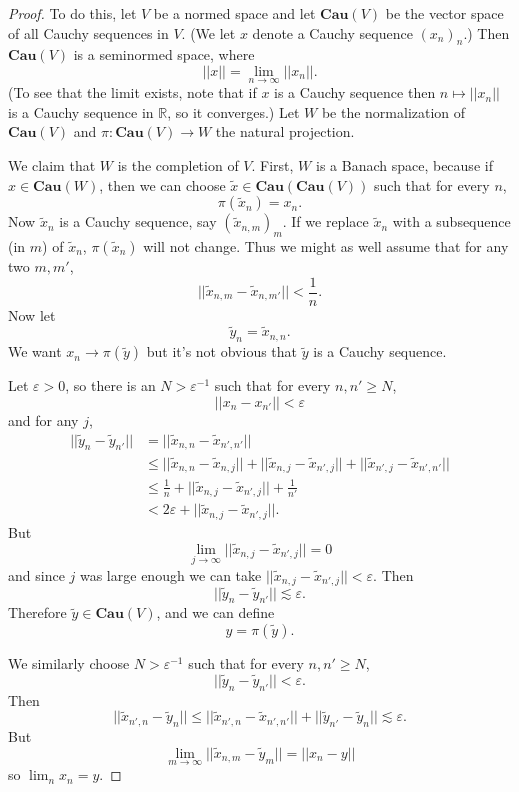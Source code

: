 \documentclass[12pt]{book}
\newcommand{\RR}{\mathbb{R}}
\newcommand{\Cau}{\mathbf{Cau}}
\theoremstyle{definition}
\begin{document}
\begin{proof}
To do this, let $V$ be a normed space and let $\Cau (V)$ be the vector space of all Cauchy sequences in $V$.
(We let $x$ denote a Cauchy sequence $(x_n)_n$.)
Then $\Cau (V)$ is a seminormed space, where
$$||x|| = \lim_{n \to \infty} ||x_n||.$$
(To see that the limit exists, note that if $x$ is a Cauchy sequence then $n \mapsto ||x_n||$ is a Cauchy sequence in $\RR$, so it converges.)
Let $W$ be the normalization of $\Cau (V)$ and $\pi: \Cau (V) \to W$ the natural projection.

We claim that $W$ is the completion of $V$.
First, $W$ is a Banach space, because if $x \in \Cau (W)$, then we can choose $\widetilde x \in \Cau (\Cau (V))$ such that for every $n$,
$$\pi(\widetilde x_n) = x_n.$$
Now $\widetilde x_n$ is a Cauchy sequence, say $(\widetilde x_{n,m})_m$. If we replace $\widetilde x_n$ with a subsequence (in $m$) of $\widetilde x_n$, $\pi(\widetilde x_n)$ will not change.
Thus we might as well assume that for any two $m,m'$,
$$||\widetilde x_{n,m} - \widetilde x_{n,m'}|| < \frac{1}{n}.$$
Now let
$$\widetilde y_n = \widetilde x_{n,n}.$$
We want $x_n \to \pi(\widetilde y)$ but it's not obvious that $\widetilde y$ is a Cauchy sequence.

Let $\varepsilon > 0$, so there is an $N > \varepsilon^{-1}$ such that for every $n, n' \geq N$,
$$||x_n - x_{n'}|| < \varepsilon$$
and for any $j$,
\begin{align*}
  ||\widetilde y_n - \widetilde y_{n'}|| &= ||\widetilde x_{n,n} - \widetilde x_{n',n'}||\\
  &\leq ||\widetilde x_{n,n} - \widetilde x_{n,j}|| + ||\widetilde x_{n,j} - \widetilde x_{n',j}|| + ||\widetilde x_{n',j} - \widetilde x_{n',n'}||\\
  &\leq \frac{1}{n} + ||\widetilde x_{n,j} - \widetilde x_{n',j}|| + \frac{1}{n'}\\
  &< 2\varepsilon + ||\widetilde x_{n,j} - \widetilde x_{n',j}||.
\end{align*}
But
$$\lim_{j \to \infty} ||\widetilde x_{n,j} - \widetilde x_{n',j}|| = 0$$
and since $j$ was large enough we can take $||\widetilde x_{n,j} - \widetilde x_{n',j}|| < \varepsilon$. Then
$$||\widetilde y_n - \widetilde y_{n'}|| \lesssim \varepsilon.$$
Therefore $\widetilde y \in \Cau (V)$, and we can define
$$y = \pi(\widetilde y).$$

We similarly choose $N > \varepsilon^{-1}$ such that for every $n, n' \geq N$,
$$||\widetilde y_n - \widetilde y_{n'}|| < \varepsilon.$$
Then
$$||\widetilde x_{n',n} - \widetilde y_n|| \leq ||\widetilde x_{n',n} - \widetilde x_{n',n'}|| + ||\widetilde y_{n'} - \widetilde y_n|| \lesssim \varepsilon.$$
But
$$\lim_{m \to \infty} ||\widetilde x_{n,m} - \widetilde y_m|| = ||x_n - y||$$
so $\lim_n x_n = y$.


\end{proof}
\end{document}
